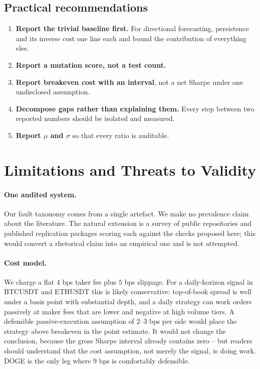 \documentclass[preprint,12pt,authoryear]{elsarticle}
\begin{document}
\subsection{Practical recommendations}

\begin{enumerate}
\item \textbf{Report the trivial baseline first.} For directional forecasting,
persistence and its inverse cost one line each and bound the contribution of
everything else.
\item \textbf{Report a mutation score, not a test count.}
\item \textbf{Report breakeven cost with an interval}, not a net Sharpe under one
undisclosed assumption.
\item \textbf{Decompose gaps rather than explaining them.} Every step between two
reported numbers should be isolated and measured.
\item \textbf{Report $\mu$ and $\sigma$} so that every ratio is auditable.
\end{enumerate}

\section{Limitations and Threats to Validity}
\label{sec:limitations}

\paragraph{One audited system.} Our fault taxonomy comes from a single artefact.
We make no prevalence claim about the literature. The natural extension is a
survey of public repositories and published replication packages scoring each
against the checks proposed here; this would convert a rhetorical claim into an
empirical one and is not attempted.

\paragraph{Cost model.} We charge a flat $4$ bps taker fee plus $5$ bps slippage.
For a daily-horizon signal in BTCUSDT and ETHUSDT this is likely conservative:
top-of-book spread is well under a basis point with substantial depth, and a
daily strategy can work orders passively at maker fees that are lower and
negative at high volume tiers. A defensible passive-execution assumption of
$2$--$3$ bps per side would place the strategy above breakeven in the point
estimate. It would not change the conclusion, because the gross Sharpe interval
already contains zero -- but readers should understand that the cost assumption,
not merely the signal, is doing work. DOGE is the only leg where $9$ bps is
comfortably defensible.
\end{document}
